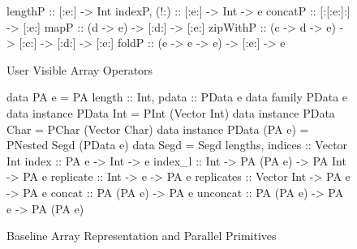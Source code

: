 \begin{figure}
\begin{small}
\begin{code}
 lengthP      :: [:e:] -> Int
 indexP, (!:) :: [:e:] -> Int -> e
 concatP      :: [:[:e:]:]     -> [:e:]
 mapP         :: (d -> e)      -> [:d:] -> [:e:]
 zipWithP     :: (c -> d -> e) -> [:c:] -> [:d:] -> [:e:]
 foldP        :: (e -> e -> e) -> [:e:] -> e
\end{code}
\end{small}
\caption{User Visible Array Operators}
\label{figure:UserVisibleArrayOperators}
\end{figure}


\begin{figure}
\begin{small}
\begin{code}
data PA e = PA {length :: Int, pdata :: PData e}
data family   PData e
data instance PData Int    = PInt  (Vector Int)
data instance PData Char   = PChar (Vector Char)
data instance PData (PA e) = PNested Segd (PData e)
data Segd = Segd {lengths, indices :: Vector Int}
index       :: PA e       -> Int       -> e
index_l     :: Int        -> PA (PA e) -> PA Int -> PA e
replicate   :: Int        -> e         -> PA e
replicates  :: Vector Int -> PA e      -> PA e
concat      :: PA (PA e)  -> PA e
unconcat    :: PA (PA e)  -> PA e      -> PA (PA e)
\end{code}
\end{small}
\caption{Baseline Array Representation and Parallel Primitives}
\label{figure:OldArrayRepresentation}
\end{figure}
